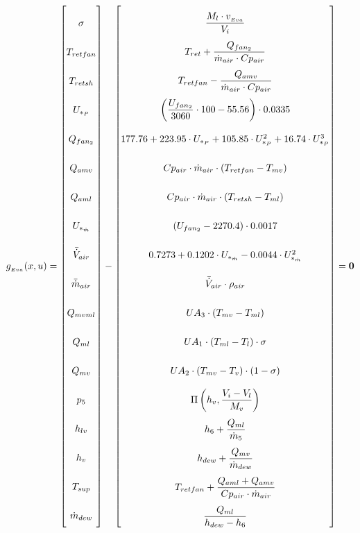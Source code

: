 \begin{equation} \label{eq:Gevaporator}\renewcommand{\arraystretch}{2.5}
	g_{_{Eva}}(x,u) =  \begin{bmatrix}
		\sigma              \\
		T_{retfan}          \\
		T_{retsh}           \\
		U_{*_P}             \\
		Q_{fan_2}           \\
		Q_{amv}             \\
		Q_{aml}             \\
		U_{*_{\dot{m}}}     \\
		\bar{\dot{V}}_{air} \\
		\bar{\dot{m}}_{air} \\
		Q_{mvml}            \\
		Q_{ml}              \\
		Q_{mv}              \\
		p_{5}               \\
		h_{lv}              \\
		h_v                 \\
		T_{sup}             \\
		\dot{m}_{dew}
	\end{bmatrix}
	-
	\begin{bmatrix}
		\dfrac{M_l \cdot v_{_{Eva}}}{V_i}							\\
		T_{ret} + \dfrac{Q_{fan_2}}{\dot{m}_{air} \cdot Cp_{air}}			\\
		T_{retfan} - \dfrac{Q_{amv}}{\dot{m}_{air} \cdot Cp_{air}}		\\
		\left( \dfrac{U_{fan_2}}{3060}\cdot 100 - 55.56 \right) \cdot 0.0335 \\
		177.76 + 223.95 \cdot U_{*_P} + 105.85 \cdot U_{*_P}^2 + 16.74 \cdot U_{*_P}^3 \\
		Cp_{air} \cdot \dot{m}_{air} \cdot (T_{retfan} - T_{mv}) 	 \\
		Cp_{air} \cdot \dot{m}_{air} \cdot (T_{retsh} - T_{ml}) \\
		(U_{fan_2} - 2270.4)\cdot 0.0017 \\
		0.7273 + 0.1202 \cdot 	U_{*_{\dot{m}}}  -0.0044 \cdot	U_{*_{\dot{m}}}^2\\
		\bar{\dot{V}}_{air} \cdot \rho_{air}	\\
		U A_3 \cdot (T_{mv} - T_{ml})	\\
		U A_1 \cdot (T_{ml} - T_l) \cdot \sigma	\\
		U A_2 \cdot (T_{mv} - T_v) \cdot (1- \sigma)	\\
		\Pi \left( h_v, \dfrac{V_i-V_l}{M_v} \right)		\\
		h_{6} + \dfrac{Q_{ml}}{\dot{m}_{5}}			\\
		h_{dew} + \dfrac{Q_{mv}}{\dot{m}_{dew}}   		\\
		T_{retfan} +  \dfrac{Q_{aml} + Q_{amv}}{Cp_{air} \cdot \dot{m}_{air}} \\
		\dfrac{Q_{ml}}{h_{dew} - h_{6}}		\\
	\end{bmatrix}
	=\textbf{0}
\end{equation}


